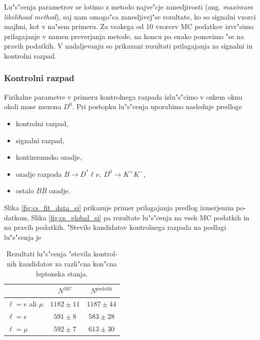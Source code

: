 \begin{otherlanguage}{slovene}
Lu"s"cenja parametrov se lotimo z metodo najve"cje zanesljivosti (ang. \textit{maximum likelihood method}), saj nam omogo"ca zanesljivej"se rezultate, ko so signalni vzorci majhni, kot v na"sem primeru. Za vsakega od 10 vzorcev MC podatkov izvr"simo prilagajanje v namen preverjanja metode, na koncu pa enako ponovimo "se na pravih podatkih. V nadaljevanju so prikazani rezultati prilagajanja za signalni in kontrolni razpad.

\subsubsection{Kontrolni razpad}
Fizikalne parametre v primeru kontrolnega razpada izlu"s"cimo v ozkem oknu okoli mase mezona $D^0$. Pri postopku lu"s"cenja uporabimo naslednje predloge
\begin{itemize}
\item kontrolni razpad,
\item signalni razpad,
\item kontinuumsko ozadje,
\item ozadje razpada $B\to D^* \ell \nu,~D^0 \to K^+K^-$,
\item ostalo $B \bar B$ ozadje.
\end{itemize}

Slika \ref{fig:cs_fit_data_si} prikazuje primer prilagajanja predlog izmerjenim podatkom, Slika \ref{fig:cs_global_si} pa rezultate lu"s"cenja na vseh MC podatkih in na pravih podatkih. "Stevilo kandidatov kontrolnega razpada na podlagi lu"s"cenja je

\begin{table}[H]
	\centering
	\begin{tabular}{l|c|c}
		& $N^{MC}$ & $N^{\mathrm{podatki}}$ \\
		\toprule
		$\ell = e$ ali $\mu$ & $1182 \pm 11$ & $1187 \pm 44$\\
		$\ell = e$ & $591 \pm 8$ & $583 \pm 28$ \\
		$\ell = \mu$ & $592 \pm 7$ & $613 \pm 30$\\
		\bottomrule
	\end{tabular}
	\captionsetup{width=0.8\linewidth}
	\caption{Rezultati lu"s"cenja "stevila kontrolnih kandidatov za razli"cna kon"cna leptonska stanja.}
	\label{tab:cs_fit_yield_si}
\end{table}


\end{otherlanguage}
